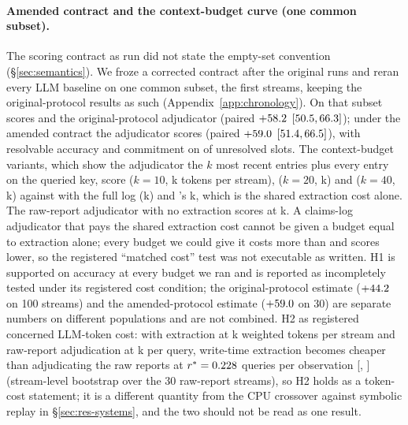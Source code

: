 \paragraph{Amended contract and the context-budget curve (one common subset).} The scoring contract as run did not state the empty-set convention (\S\ref{sec:semantics}). We froze a corrected contract after the original runs and reran every LLM baseline on one common subset, the first \sTwoSubN{} streams, keeping the original-protocol results as such (Appendix~\ref{app:chronology}). On that subset \pal{} scores \sTwoSubPalWarr{} and the original-protocol adjudicator \sTwoSubLogWarr{} (paired $+58.2$ $[50.5, 66.3]$); under the amended contract the adjudicator scores \sTwoCtwoLogWarr{} (paired $+59.0$ $[51.4, 66.5]$), with resolvable accuracy \sTwoCtwoLogRes{} and commitment on \sTwoCtwoLogCommit{} of unresolved slots. The context-budget variants, which show the adjudicator the $k$ most recent entries plus every entry on the queried key, score \sTwoCtwoTopTenWarr{} ($k=10$, \sTwoCtwoTopTenTok{}k tokens per stream), \sTwoCtwoTopTwentyWarr{} ($k=20$, \sTwoCtwoTopTwentyTok{}k) and \sTwoCtwoTopFortyWarr{} ($k=40$, \sTwoCtwoTopFortyTok{}k) against \sTwoCtwoLogWarr{} with the full log (\sTwoCtwoLogTok{}k) and \pal's \xE{}k, which is the shared extraction cost alone. The raw-report adjudicator with no extraction scores \sTwoCtwoNlWarr{} at \sTwoCtwoNlTok{}k. A claims-log adjudicator that pays the shared extraction cost cannot be given a budget equal to extraction alone; every budget we could give it costs more than \pal{} and scores lower, so the registered ``matched cost'' test was not executable as written. H1 is supported on accuracy at every budget we ran and is reported as incompletely tested under its registered cost condition; the original-protocol estimate ($+44.2$ on 100 streams) and the amended-protocol estimate ($+59.0$ on 30) are separate numbers on different populations and are not combined. H2 as registered concerned LLM-token cost: with extraction at \xE{}k weighted tokens per stream and raw-report adjudication at \xAnl{}k per query, write-time extraction becomes cheaper than adjudicating the raw reports at $r^*=0.228$ queries per observation [\holmHTwoLo, \holmHTwoHi] (stream-level bootstrap over the 30 raw-report streams), so H2 holds as a token-cost statement; it is a different quantity from the CPU crossover against symbolic replay in \S\ref{sec:res-systems}, and the two should not be read as one result.

